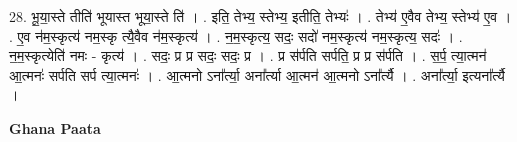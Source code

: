 \documentclass[17pt]{extarticle}
\begin{document}
28. भू॒या॒स्ते तीति॑ भूयास्त भूया॒स्ते ति॑ । . इति॒ तेभ्य॒ स्तेभ्य॒ इतीति॒ तेभ्यः॑ । . तेभ्य॑ ए॒वैव तेभ्य॒ स्तेभ्य॑ ए॒व । . ए॒व न॑म॒स्कृत्य॑ नम॒स्कृ त्यै॒वैव न॑म॒स्कृत्य॑ । . न॒म॒स्कृत्य॒ सदः॒ सदो॑ नम॒स्कृत्य॑ नम॒स्कृत्य॒ सदः॑ । . न॒म॒स्कृत्येति॑ नमः - कृत्य॑ । . सदः॒ प्र प्र सदः॒ सदः॒ प्र । . प्र स॑र्पति सर्पति॒ प्र प्र स॑र्पति । . स॒र्प॒ त्या॒त्मन॑ आ॒त्मनः॑ सर्पति सर्प त्या॒त्मनः॑ । . आ॒त्मनो ऽना᳚र्त्या॒ अना᳚र्त्या आ॒त्मन॑ आ॒त्मनो ऽना᳚र्त्यै । . अना᳚र्त्या॒ इत्यना᳚र्त्यै । \newline

\textbf{Ghana Paata } \newline
\end{document}
